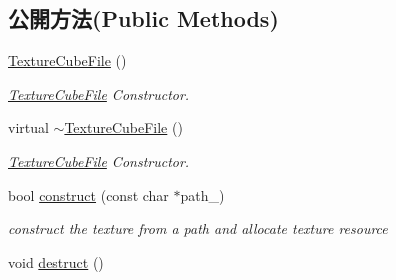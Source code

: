 \subsection*{公開方法(Public Methods)}
\begin{DoxyCompactItemize}
\item 
\hyperlink{class_magnum_1_1_texture_cube_file_ac1f87db02753fa2e263421af7c9a976b}{Texture\+Cube\+File} ()
\begin{DoxyCompactList}\small\item\em \hyperlink{class_magnum_1_1_texture_cube_file}{Texture\+Cube\+File} Constructor. \end{DoxyCompactList}\item 
virtual \hyperlink{class_magnum_1_1_texture_cube_file_a3b88ee794b2b3725f68eccc3613e1596}{$\sim$\+Texture\+Cube\+File} ()
\begin{DoxyCompactList}\small\item\em \hyperlink{class_magnum_1_1_texture_cube_file}{Texture\+Cube\+File} Constructor. \end{DoxyCompactList}\item 
bool \hyperlink{class_magnum_1_1_texture_cube_file_a42be226eb1a851814e719c1598bc0b49}{construct} (const char $\ast$path\+\_\+)
\begin{DoxyCompactList}\small\item\em construct the texture from a path and allocate texture resource \end{DoxyCompactList}\item 
void \hyperlink{class_magnum_1_1_texture_cube_file_a1132d1610cae021b5f4e9a4061d11429}{destruct} ()\hypertarget{class_magnum_1_1_texture_cube_file_a1132d1610cae021b5f4e9a4061d11429}{}\label{class_magnum_1_1_texture_cube_file_a1132d1610cae021b5f4e9a4061d11429}


\end{DoxyCompactItemize}

